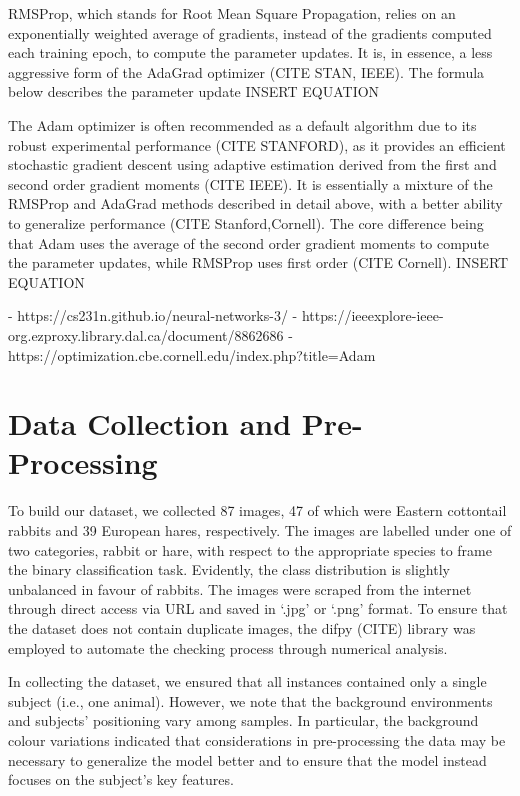 \documentclass{article}
\begin{document}
RMSProp, which stands for Root Mean Square Propagation, relies on an exponentially weighted average of gradients, instead of the gradients computed each training epoch, to compute the parameter updates. It is, in essence, a less aggressive form of the AdaGrad optimizer (CITE STAN, IEEE). The formula below describes the parameter update
		INSERT EQUATION

The Adam optimizer is often recommended as a default algorithm due to its robust experimental performance (CITE STANFORD), as it provides an efficient stochastic gradient descent using adaptive estimation derived from the first and second order gradient moments (CITE IEEE). It is essentially a mixture of the RMSProp and AdaGrad methods described in detail above, with a better ability to generalize performance (CITE Stanford,Cornell). The core difference being that Adam uses the average of the second order gradient moments to compute the parameter updates, while RMSProp uses first order (CITE Cornell).
		INSERT EQUATION



-	https://cs231n.github.io/neural-networks-3/ 
-	https://ieeexplore-ieee-org.ezproxy.library.dal.ca/document/8862686
-	https://optimization.cbe.cornell.edu/index.php?title=Adam 


\section{Data Collection and Pre-Processing}
To build our dataset, we collected 87 images, 47 of which were Eastern cottontail rabbits and 39 European hares, respectively. The images are labelled under one of two categories, rabbit or hare, with respect to the appropriate species to frame the binary classification task. Evidently, the class distribution is slightly unbalanced in favour of rabbits. The images were scraped from the internet through direct access via URL and saved in ‘.jpg’ or ‘.png’ format. To ensure that the dataset does not contain duplicate images, the difpy (CITE) library was employed to automate the checking process through numerical analysis. 

In collecting the dataset, we ensured that all instances contained only a single subject (i.e., one animal). However, we note that the background environments and subjects’ positioning vary among samples. In particular, the background colour variations indicated that considerations in pre-processing the data may be necessary to generalize the model better and to ensure that the model instead focuses on the subject’s key features. 
\end{document}
